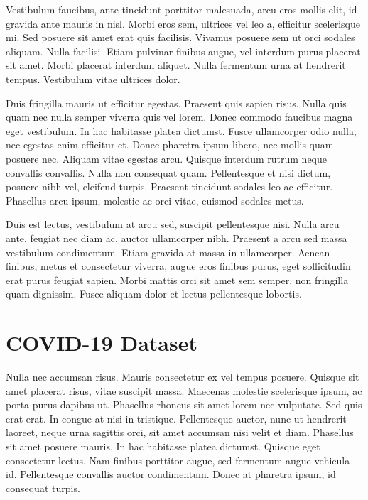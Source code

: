 Vestibulum faucibus, ante tincidunt porttitor malesuada, arcu eros mollis elit, id gravida ante mauris in nisl. Morbi eros sem, ultrices vel leo a, efficitur scelerisque mi. Sed posuere sit amet erat quis facilisis. Vivamus posuere sem ut orci sodales aliquam. Nulla facilisi. Etiam pulvinar finibus augue, vel interdum purus placerat sit amet. Morbi placerat interdum aliquet. Nulla fermentum urna at hendrerit tempus. Vestibulum vitae ultrices dolor.

Duis fringilla mauris ut efficitur egestas. Praesent quis sapien risus. Nulla quis quam nec nulla semper viverra quis vel lorem. Donec commodo faucibus magna eget vestibulum. In hac habitasse platea dictumst. Fusce ullamcorper odio nulla, nec egestas enim efficitur et. Donec pharetra ipsum libero, nec mollis quam posuere nec. Aliquam vitae egestas arcu. Quisque interdum rutrum neque convallis convallis. Nulla non consequat quam. Pellentesque et nisi dictum, posuere nibh vel, eleifend turpis. Praesent tincidunt sodales leo ac efficitur. Phasellus arcu ipsum, molestie ac orci vitae, euismod sodales metus.

Duis est lectus, vestibulum at arcu sed, suscipit pellentesque nisi. Nulla arcu ante, feugiat nec diam ac, auctor ullamcorper nibh. Praesent a arcu sed massa vestibulum condimentum. Etiam gravida at massa in ullamcorper. Aenean finibus, metus et consectetur viverra, augue eros finibus purus, eget sollicitudin erat purus feugiat sapien. Morbi mattis orci sit amet sem semper, non fringilla quam dignissim. Fusce aliquam dolor et lectus pellentesque lobortis. 

\section{COVID-19 Dataset} %
\label{sub:amet}
Nulla nec accumsan risus. Mauris consectetur ex vel tempus posuere. Quisque sit amet placerat risus, vitae suscipit massa. Maecenas molestie scelerisque ipsum, ac porta purus dapibus ut. Phasellus rhoncus sit amet lorem nec vulputate. Sed quis erat erat. In congue at nisi in tristique. Pellentesque auctor, nunc ut hendrerit laoreet, neque urna sagittis orci, sit amet accumsan nisi velit et diam. Phasellus sit amet posuere mauris. In hac habitasse platea dictumst. Quisque eget consectetur lectus. Nam finibus porttitor augue, sed fermentum augue vehicula id. Pellentesque convallis auctor condimentum. Donec at pharetra ipsum, id consequat turpis.

